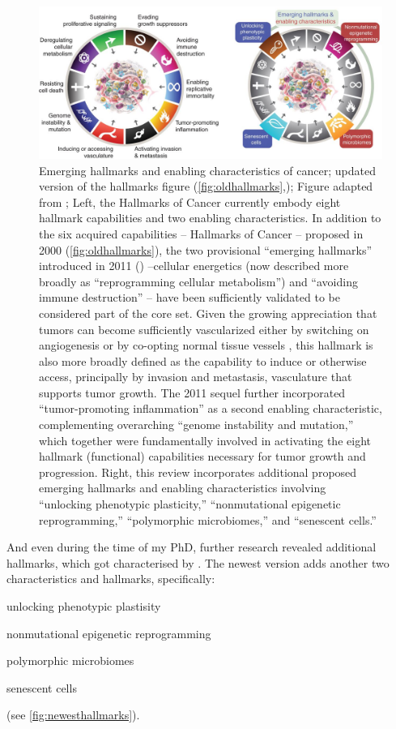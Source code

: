 \begin{figure}[!ht]
\centering
\includegraphics[width=.95\linewidth]{Figures/newestHallmarksOfCancer.jpg}
\caption[Newest hallmarks of cancer]{Emerging hallmarks and enabling characteristics of cancer; updated version of the hallmarks figure (\autoref{fig:oldhallmarks},\cite{Hanahan2000}); Figure adapted from \protect\citeauthor*{Hanahan2022}\protect\cite{Hanahan2022}; Left, the Hallmarks of Cancer currently embody eight hallmark capabilities and two enabling characteristics. In addition to the six acquired capabilities -- Hallmarks of Cancer -- proposed in 2000 (\autoref{fig:oldhallmarks}), the two provisional “emerging hallmarks” introduced in 2011 (\cite{Hanahan2011}) --cellular energetics (now described more broadly as “reprogramming cellular metabolism”) and “avoiding immune destruction” -- have been sufficiently validated to be considered part of the core set. Given the growing appreciation that tumors can become sufficiently vascularized either by switching on angiogenesis or by co-opting normal tissue vessels \cite{Kuczynski2019}, this hallmark is also more broadly defined as the capability to induce or otherwise access, principally by invasion and metastasis, vasculature that supports tumor growth. The 2011 sequel further incorporated “tumor-promoting inflammation” as a second enabling characteristic, complementing overarching “genome instability and mutation,” which together were fundamentally involved in activating the eight hallmark (functional) capabilities necessary for tumor growth and progression. Right, this review incorporates additional proposed emerging hallmarks and enabling characteristics involving “unlocking phenotypic plasticity,” “nonmutational epigenetic reprogramming,” “polymorphic microbiomes,” and “senescent cells.”}\label{fig:newesthallmarks}
\end{figure}

And even during the time of my PhD, further research revealed additional hallmarks, which got characterised by \textcite{Hanahan2022}. The newest version adds another two characteristics and hallmarks, specifically:
\begin{enumerate*}
\item unlocking phenotypic plastisity 
\item nonmutational epigenetic reprogramming
\item polymorphic microbiomes
\item senescent cells
\end{enumerate*} 
(see \autoref{fig:newesthallmarks}).


